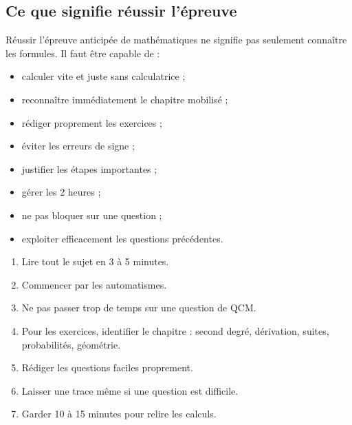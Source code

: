 \documentclass[11pt,a4paper]{article}
\begin{document}
\subsection{Ce que signifie réussir l'épreuve}

Réussir l'épreuve anticipée de mathématiques ne signifie pas seulement connaître les formules.  
Il faut être capable de :
\begin{itemize}
  \item calculer vite et juste sans calculatrice ;
  \item reconnaître immédiatement le chapitre mobilisé ;
  \item rédiger proprement les exercices ;
  \item éviter les erreurs de signe ;
  \item justifier les étapes importantes ;
  \item gérer les 2 heures ;
  \item ne pas bloquer sur une question ;
  \item exploiter efficacement les questions précédentes.
\end{itemize}

\begin{methode}
\begin{enumerate}
  \item Lire tout le sujet en 3 à 5 minutes.
  \item Commencer par les automatismes.
  \item Ne pas passer trop de temps sur une question de QCM.
  \item Pour les exercices, identifier le chapitre : second degré, dérivation, suites, probabilités, géométrie.
  \item Rédiger les questions faciles proprement.
  \item Laisser une trace même si une question est difficile.
  \item Garder 10 à 15 minutes pour relire les calculs.
\end{enumerate}
\end{methode}
\end{document}
